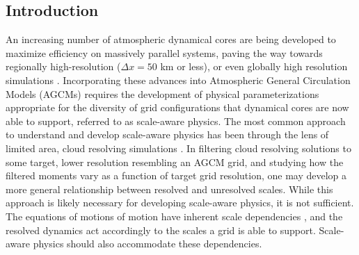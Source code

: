 \subsection{Introduction}

An increasing number of atmospheric dynamical cores are being developed to maximize efficiency on massively parallel systems, paving the way towards regionally high-resolution ($\Delta x = 50$ km or less), or even globally high resolution simulations \citep{Z2014QJRMS,HETAL2016JCLIM,DCMIP16,LetAl2018JAMES}. Incorporating these advances into Atmospheric General Circulation Models (AGCMs) requires the development of physical parameterizations appropriate for the diversity of grid configurations that dynamical cores are now able to support, referred to as scale-aware physics. The most common approach to understand and develop scale-aware physics has been through the lens of limited area, cloud resolving simulations \citep{PC2008JAS,AW2013JAS,SZ2018JCLIM}. In filtering cloud resolving solutions to some target, lower resolution resembling an AGCM grid, and studying how the filtered moments vary as a function of target grid resolution, one may develop a more general relationship between resolved and unresolved scales. While this approach is likely necessary for developing scale-aware physics, it is not sufficient. The equations of motions of motion have inherent scale dependencies \citep{O1981JAS,WETAL1997MWR,PG2006JAS,J2017JAMES}, and the resolved dynamics act accordingly to the scales a grid is able to support. Scale-aware physics should also accommodate these dependencies.

